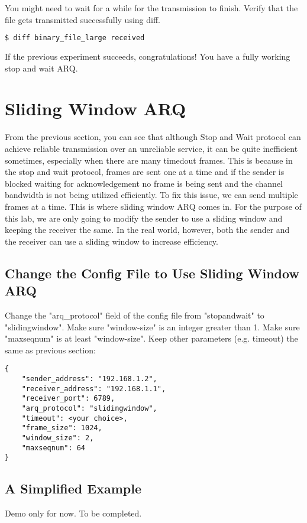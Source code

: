 \documentclass[11pt]{article}
\begin{document}
\noindent You might need to wait for a while for the transmission to finish. Verify that the file gets transmitted successfully using diff.
\begin{lstlisting}[language=bash]
$ diff binary_file_large received
\end{lstlisting}

\noindent If the previous experiment succeeds, congratulations! You have a fully working stop and wait ARQ.

\section{Sliding Window ARQ}
From the previous section, you can see that although Stop and Wait protocol can achieve reliable transmission over an unreliable service, it can be quite inefficient sometimes, especially when there are many timedout frames. This is because in the stop and wait protocol, frames are sent one at a time and if the sender is blocked waiting for acknowledgement no frame is being sent and the channel bandwidth is not being utilized efficiently. To fix this issue, we can send multiple frames at a time. This is where sliding window ARQ comes in. For the purpose of this lab, we are only going to modify the sender to use a sliding window and keeping the receiver the same. In the real world, however, both the sender and the receiver can use a sliding window to increase efficiency.

\subsection{Change the Config File to Use Sliding Window ARQ}
Change the "arq\_protocol" field of the config file from "stopandwait" to "slidingwindow". Make sure "window-size" is an integer greater than 1. Make sure "maxseqnum" is at least "window-size". Keep other parameters (e.g. timeout) the same as previous section:

\begin{lstlisting}[caption={Sliding Window Configuration}]
{
    "sender_address": "192.168.1.2",
    "receiver_address": "192.168.1.1",
    "receiver_port": 6789,
    "arq_protocol": "slidingwindow",
    "timeout": <your choice>,
    "frame_size": 1024,
    "window_size": 2,
    "maxseqnum": 64
}
\end{lstlisting}


\subsection {A Simplified Example}
Demo only for now. To be completed.
\end{document}
